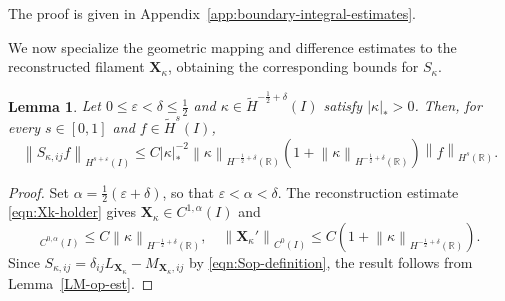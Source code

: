\documentclass[11pt,reqno]{amsart}
\theoremstyle{plain}
\newtheorem{lemma}[theorem]{Lemma}
\theoremstyle{definition}
\numberwithin{equation}{section}
\newcommand{\paren}[1]{\left(#1\right)}
\newcommand{\wt}[1]{\widetilde{#1}}
\newcommand{\bm}[1]{\boldsymbol{#1}}
\newcommand{\abs}[1]{\left\lvert #1 \right\rvert}
\newcommand{\norm}[1]{\left\lVert #1 \right\rVert}
\newcommand{\R}{\mathbb{R}}
\newcommand{\xk}{\bm X_\kappa}
\newcommand{\ci}[1]{C^{#1}(I)}
\newcommand{\hi}[1]{H^{#1}(I)}
\newcommand{\thi}[1]{\wt H^{#1}(I)}
\newcommand{\hr}[1]{H^{#1}(\R)}
\begin{document}
The proof is given in Appendix~\ref{app:boundary-integral-estimates}.


We now specialize the geometric mapping and difference estimates to the
reconstructed filament $\xk$, obtaining the corresponding bounds for
$S_\kappa$.

\begin{lemma}\label{lem:Sop-est}
Let $0\le\varepsilon<\delta\le\frac12$ and
$\kappa\in\thi{-\frac12+\delta}$ satisfy $\abs{\kappa}_*>0$.
Then, for every $s\in[0,1]$ and $f\in\thi{s}$,
\begin{equation}\label{eqn:Sop-bound}
    \norm{S_{\kappa,ij}f}_{\hi{s+\varepsilon}}
    \le C\abs{\kappa}_*^{-2}
    \norm{\kappa}_{\hr{-\frac12+\delta}}
    \paren{1+\norm{\kappa}_{\hr{-\frac12+\delta}}}
    \norm{f}_{\hr{s}}.
\end{equation}
\end{lemma}
\begin{proof}
Set $\alpha=\frac12(\varepsilon+\delta)$, so that
$\varepsilon<\alpha<\delta$. The reconstruction estimate
\eqref{eqn:Xk-holder} gives $\xk\in\ci{1,\alpha}$ and
\begin{equation}
    [\xk']_{\ci{0,\alpha}} \le C\norm{\kappa}_{\hr{-\frac12+\delta}}, \quad \norm{\xk'}_{\ci{0}} \le
    C\paren{1+\norm{\kappa}_{\hr{-\frac12+\delta}}}.
\end{equation}
Since $S_{\kappa,ij}=\delta_{ij}L_{\xk}-M_{\xk,ij}$ by
\eqref{eqn:Sop-definition}, the result follows from
Lemma~\ref{LM-op-est}.
\end{proof}
\end{document}
